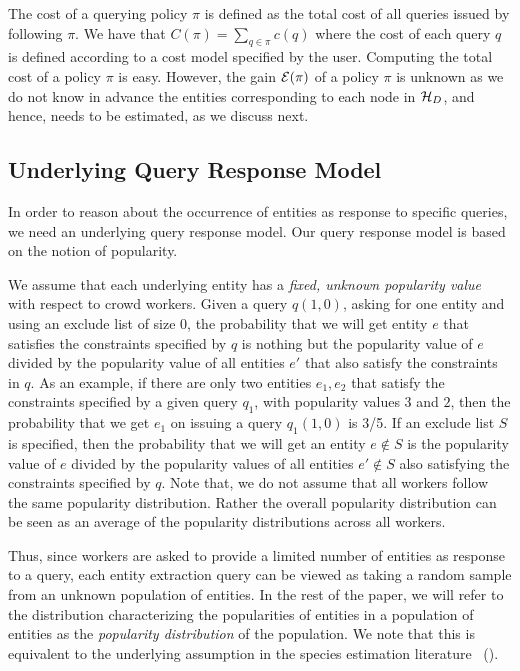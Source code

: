 The cost of a querying policy $\pi$ is defined as the total cost of all queries issued by following $\pi$. We have that $C(\pi) = \sum_{q \in \pi} c(q)$ where the cost of each query $q$ is defined according to a cost model specified by the user. Computing the total cost of a policy $\pi$ is easy. However, the gain $\mathcal{E}(\pi)$ of a policy $\pi$ is unknown as we do not know in advance the entities corresponding to each node in $\mathcal{H}_D$, and hence, needs to be estimated, as we discuss next. 

\subsection{Underlying Query Response Model}
\label{sec:sampling}
In order to reason about the occurrence of entities as response to specific queries, we need an underlying query response model. Our query response model is based on the notion of popularity.

 We assume that each underlying entity has a {\em fixed, unknown popularity value} with respect to crowd workers. Given a query $q(1, 0)$, asking for one entity and using an exclude list of size $0$, the probability that we will get entity $e$ that satisfies the constraints specified by $q$ is nothing but the popularity value of $e$ divided by the popularity value of all entities $e'$ that also satisfy the constraints in $q$. As an example, if there are only two entities $e_1, e_2$ that satisfy the constraints specified by a given query $q_1$, with popularity values $3$ and $2$,
then the probability that we get $e_1$ on issuing a query $q_1(1, 0)$ is 3/5. 
If an exclude list $S$ is specified, then the probability that we will get an entity $e \notin S$ is the popularity value of $e$ divided by the popularity values of all entities $e' \notin S$ also satisfying the constraints specified by $q$. Note that, we do not assume that all workers follow the same popularity distribution. Rather the overall popularity distribution can be seen as an average of the popularity distributions across all workers.

Thus, since workers are asked to provide a limited number of entities as response to a query, each entity extraction query can be viewed as taking a random sample from an unknown population of entities. In the rest of the paper, we will refer to the distribution characterizing the popularities of entities in a population of entities as the {\em popularity distribution} of the population. We note that this is equivalent to the underlying assumption in the species estimation literature~\cite{chao:1992} ().

